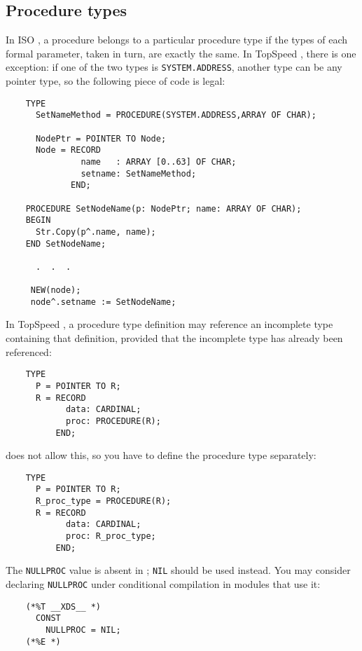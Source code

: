 \subsection{Procedure types}

    In ISO \mt{}, a procedure belongs to a particular procedure type
    if the types of each formal parameter, taken in turn, are exactly the same.
    In TopSpeed \mt{}, there is one exception: if one of the two types is 
    \verb'SYSTEM.ADDRESS', another type can be any pointer type,
    so the following piece of code is legal:

\begin{verbatim}
    TYPE
      SetNameMethod = PROCEDURE(SYSTEM.ADDRESS,ARRAY OF CHAR);

      NodePtr = POINTER TO Node;
      Node = RECORD
               name   : ARRAY [0..63] OF CHAR;
               setname: SetNameMethod;
             END;
                 
    PROCEDURE SetNodeName(p: NodePtr; name: ARRAY OF CHAR);
    BEGIN
      Str.Copy(p^.name, name);
    END SetNodeName;

      .  .  .
   
     NEW(node);
     node^.setname := SetNodeName;
\end{verbatim}

    In TopSpeed \mt{}, a procedure type definition may reference an incomplete
    type containing that definition, provided that the incomplete type has 
    already been referenced:

\begin{verbatim}
    TYPE
      P = POINTER TO R;
      R = RECORD
            data: CARDINAL;
            proc: PROCEDURE(R);
          END;
\end{verbatim}

    \xds{} does not allow this, so you have to define the procedure type 
    separately:

\begin{verbatim}
    TYPE
      P = POINTER TO R;
      R_proc_type = PROCEDURE(R);
      R = RECORD
            data: CARDINAL;
            proc: R_proc_type;
          END;
\end{verbatim}

    The \verb'NULLPROC' value is absent in \xds{}; \verb'NIL' should be
    used instead. You may consider declaring \verb'NULLPROC' under 
    conditional compilation in modules that use it:

\begin{verbatim}
    (*%T __XDS__ *)
      CONST 
        NULLPROC = NIL;
    (*%E *)
\end{verbatim}

